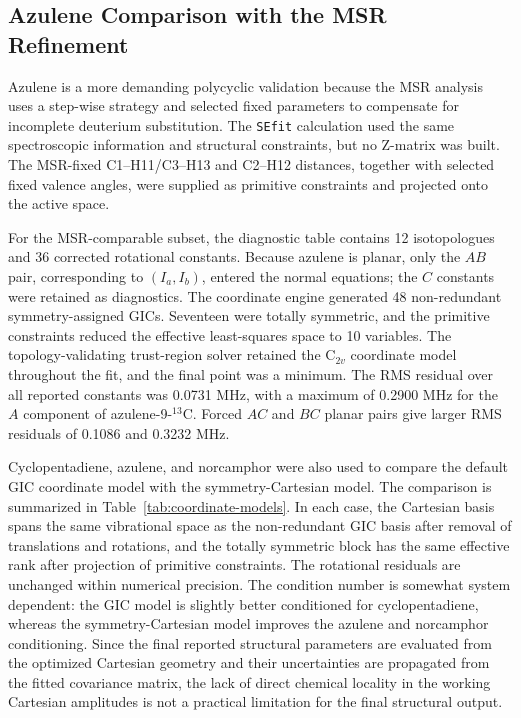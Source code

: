 \documentclass[journal=jctcce,manuscript=article,maxauthors=999]{achemso}
\begin{document}
\subsection{Azulene Comparison with the MSR Refinement}

Azulene is a more demanding polycyclic validation because the MSR analysis uses
a step-wise strategy and selected fixed parameters to compensate for incomplete
deuterium substitution. The \texttt{SEfit} calculation used
the same spectroscopic information and structural constraints, but no Z-matrix
was built. The MSR-fixed C1--H11/C3--H13 and C2--H12 distances, together with
selected fixed valence angles, were supplied as primitive constraints and
projected onto the active space.

For the MSR-comparable subset, the diagnostic table contains 12 isotopologues
and 36 corrected rotational constants. Because azulene is planar, only the
$AB$ pair, corresponding to $(I_a,I_b)$, entered the normal equations; the
$C$ constants were retained as diagnostics. The coordinate engine generated 48
non-redundant symmetry-assigned GICs. Seventeen were totally symmetric, and
the primitive constraints reduced the effective least-squares space to 10
variables. The topology-validating trust-region solver retained the C$_{2v}$
coordinate model throughout the fit, and the final point was a minimum. The
RMS residual over all reported constants was 0.0731 MHz, with a maximum of
0.2900 MHz for the $A$ component of azulene-9-$^{13}$C. Forced $AC$ and $BC$
planar pairs give larger RMS residuals of 0.1086 and 0.3232 MHz.

Cyclopentadiene, azulene, and norcamphor were also used to compare the default
GIC coordinate model with the symmetry-Cartesian model. The
comparison is summarized in Table~\ref{tab:coordinate-models}. In each case,
the Cartesian basis spans the same vibrational space as the non-redundant GIC
basis after removal of translations and rotations, and the totally symmetric
block has the same effective rank after projection of primitive constraints.
The rotational residuals are unchanged within numerical precision. The
condition number is somewhat system dependent: the GIC model is slightly better
conditioned for cyclopentadiene, whereas the symmetry-Cartesian model improves
the azulene and norcamphor conditioning. Since the final reported structural
parameters are evaluated from the optimized Cartesian geometry and their
uncertainties are propagated from the fitted covariance matrix, the lack of
direct chemical locality in the working Cartesian amplitudes is not a practical
limitation for the final structural output.
\end{document}
